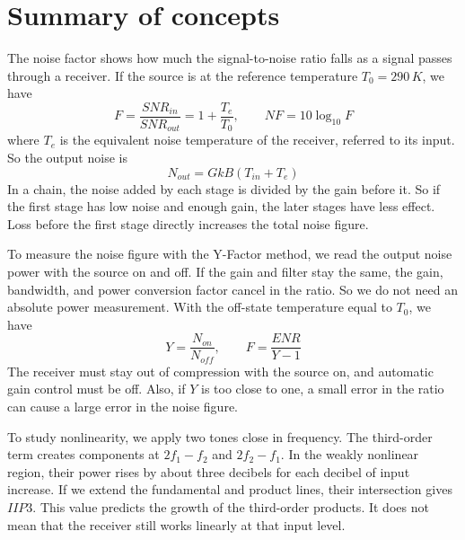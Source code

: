 \documentclass[]{article}
\newcommand{\lr}[1]{#1}
\begin{document}
    
    \tableofcontents
    \newpage

    \section{Summary of concepts}
    The noise factor shows how much the signal-to-noise ratio falls as a signal passes through a receiver. If the source is at the reference temperature
    $T_0=290\,K$, we have
    \begin{equation*}
        F=\frac{SNR_{in}}{SNR_{out}}=1+\frac{T_e}{T_0},\qquad NF=10\log_{10}F
    \end{equation*}
    where
    $T_e$
    is the equivalent noise temperature of the receiver, referred to its input. So the output noise is
    \begin{equation*}
        N_{out}=GkB(T_{in}+T_e)
    \end{equation*}
    In a chain, the noise added by each stage is divided by the gain before it. So if the first stage has low noise and enough gain, the later stages have less effect. Loss before the first stage directly increases the total noise figure.

    To measure the noise figure with the
    \lr{Y-Factor}
    method, we read the output noise power with the source on and off. If the gain and filter stay the same, the gain, bandwidth, and power conversion factor cancel in the ratio. So we do not need an absolute power measurement. With the off-state temperature equal to
    $T_0$, we have
    \begin{equation*}
        Y=\frac{N_{on}}{N_{off}},\qquad F=\frac{ENR}{Y-1}
    \end{equation*}
    The receiver must stay out of compression with the source on, and automatic gain control must be off. Also, if
    $Y$
    is too close to one, a small error in the ratio can cause a large error in the noise figure.

    To study nonlinearity, we apply two tones close in frequency. The third-order term creates components at
    $2f_1-f_2$
    and
    $2f_2-f_1$. In the weakly nonlinear region, their power rises by about three decibels for each decibel of input increase. If we extend the fundamental and product lines, their intersection gives
    $IIP3$. This value predicts the growth of the third-order products. It does not mean that the receiver still works linearly at that input level.


    \newpage
\end{document}
